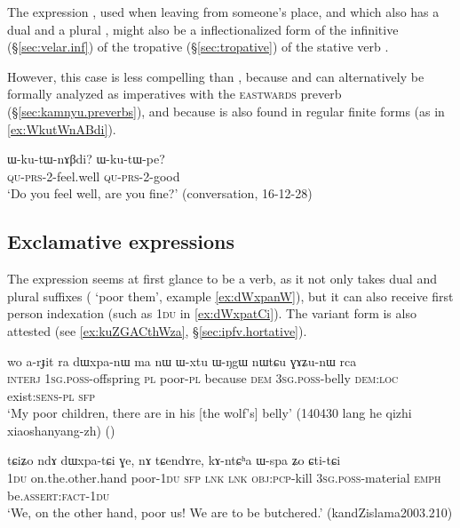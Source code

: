 The expression , used when leaving from someone's place, and which also has a dual  and a plural , might also be a inflectionalized form of the  infinitive (§\ref{sec:velar.inf}) of the  tropative   (§\ref{sec:tropative}) of the stative verb .

However, this case is less compelling than , because  and  can alternatively be formally analyzed as imperatives with the \textsc{eastwards}  preverb (§\ref{sec:kamnyu.preverbs}), and because  is also found in regular finite forms (as in \ref{ex:WkutWnABdi}).

\begin{exe}
\ex \label{ex:WkutWnABdi}
\gll  ɯ-ku-tɯ-nɤβdi? ɯ-ku-tɯ-pe? \\
 \textsc{qu}-\textsc{prs}-2-feel.well  \textsc{qu}-\textsc{prs}-2-good \\
\glt `Do you feel well, are you fine?' (conversation, 16-12-28)
\end{exe}

\subsection{Exclamative expressions} \label{sec:exclamative.inflectionalization}
The expression  seems at first glance to be a verb, as it not only takes dual and plural suffixes ( `poor them', example \ref{ex:dWxpanW}), but it can also receive first person indexation (such as \textsc{1du} in \ref{ex:dWxpatCi}). The variant form  is also attested (see \ref{ex:kuZGACthWza}, §\ref{sec:ipfv.hortative}).

\begin{exe}
\ex \label{ex:dWxpanW}
\gll wo a-rɟit ra dɯxpa-nɯ ma nɯ ɯ-xtu ɯ-ŋgɯ nɯtɕu ɣɤʑu-nɯ rca  \\
\textsc{interj} \textsc{1sg}.\textsc{poss}-offspring \textsc{pl} poor-\textsc{pl} because \textsc{dem} \textsc{3sg}.\textsc{poss}-belly  \textsc{dem}:\textsc{loc}  exist:\textsc{sens}-\textsc{pl} \textsc{sfp} \\
\glt `My poor children, there are in his [the wolf's] belly' (140430 lang he qizhi xiaoshanyang-zh)
()
\end{exe}

\begin{exe}
\ex \label{ex:dWxpatCi}
\gll tɕiʑo ndɤ dɯxpa-tɕi ɣe, nɤ tɕendɤre, kɤ-ntɕʰa ɯ-spa ʑo ɕti-tɕi \\
\textsc{1du} on.the.other.hand poor-\textsc{1du} \textsc{sfp} \textsc{lnk} \textsc{lnk} \textsc{obj}:\textsc{pcp}-kill \textsc{3sg}.\textsc{poss}-material \textsc{emph} be.\textsc{assert}:\textsc{fact}-\textsc{1du} \\
\glt `We, on the other hand, poor us! We are to be butchered.' (kandZislama2003.210)
\end{exe}

